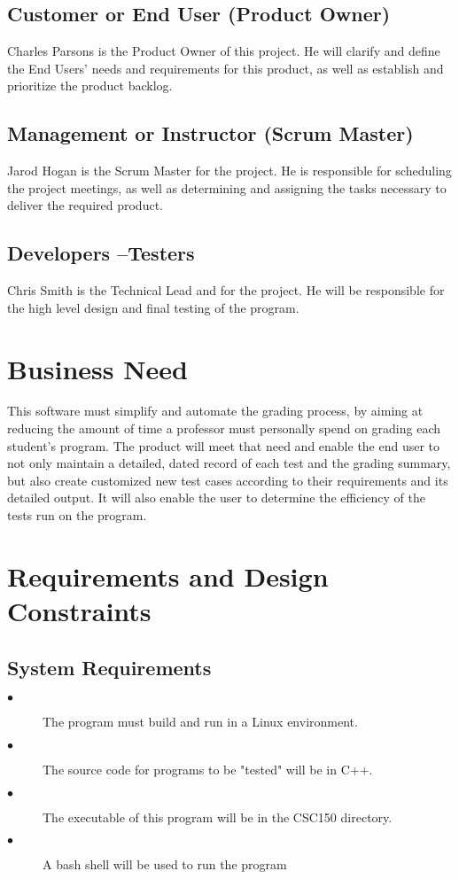 \subsection{Customer or End User (Product Owner)}
Charles Parsons is the Product Owner of this project. He will clarify and define the End Users' needs and requirements 
for this product, as well as establish and prioritize the product backlog.

\subsection{Management or Instructor (Scrum Master)}
Jarod Hogan is the Scrum Master for the project.  He is responsible for scheduling the project meetings, as well as 
determining and assigning the tasks necessary to deliver the required product.

\subsection{Developers --Testers}
Chris Smith is the Technical Lead and for the project.  He will be responsible for the high level design and final
testing of the program.

\section{Business Need}
This software must simplify and automate the grading process, by aiming at reducing the amount of time a professor must personally spend on grading each student's program.  The product will meet that need and enable 
the end user to not only maintain a detailed, dated record of each test and the grading summary, but also create customized new test cases according to their requirements and its detailed output. It will also enable the user to determine the efficiency of the tests run on the program.

\section{Requirements and Design Constraints}

\subsection{System  Requirements}

\begin{description}
\item [$\bullet$] The program must build and run in a Linux environment.
\item [$\bullet$] The source code for programs to be "tested" will be in C++.
\item [$\bullet$] The executable of this program will be in the CSC150 directory.
\item [$\bullet$] A bash shell will be used to run the program
\end{description}

